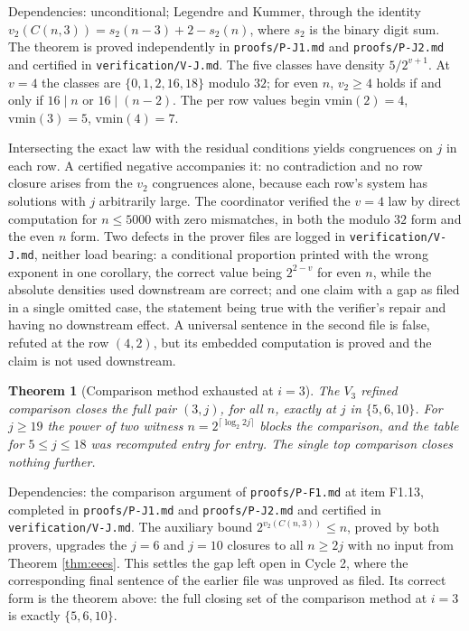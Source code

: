 \documentclass[11pt]{article}
\newtheorem{theorem}{Theorem}[section]
\theoremstyle{remark}
\begin{document}
Dependencies: unconditional; Legendre and Kummer, through the identity $v_2(C(n,3))=s_2(n-3)+2-s_2(n)$, where $s_2$ is the binary digit sum. The theorem is proved independently in \texttt{proofs/P-J1.md} and \texttt{proofs/P-J2.md} and certified in \texttt{verification/V-J.md}. The five classes have density $5/2^{v+1}$. At $v=4$ the classes are $\{0,1,2,16,18\}$ modulo $32$; for even $n$, $v_2\ge 4$ holds if and only if $16\mid n$ or $16\mid (n-2)$. The per row values begin $\mathrm{vmin}(2)=4$, $\mathrm{vmin}(3)=5$, $\mathrm{vmin}(4)=7$.

Intersecting the exact law with the residual conditions yields congruences on $j$ in each row. A certified negative accompanies it: no contradiction and no row closure arises from the $v_2$ congruences alone, because each row's system has solutions with $j$ arbitrarily large. The coordinator verified the $v=4$ law by direct computation for $n\le 5000$ with zero mismatches, in both the modulo $32$ form and the even $n$ form. Two defects in the prover files are logged in \texttt{verification/V-J.md}, neither load bearing: a conditional proportion printed with the wrong exponent in one corollary, the correct value being $2^{2-v}$ for even $n$, while the absolute densities used downstream are correct; and one claim with a gap as filed in a single omitted case, the statement being true with the verifier's repair and having no downstream effect. A universal sentence in the second file is false, refuted at the row $(4,2)$, but its embedded computation is proved and the claim is not used downstream.

\begin{theorem}[Comparison method exhausted at $i=3$]
\label{thm:comparison}
The $V_3$ refined comparison closes the full pair $(3,j)$, for all $n$, exactly at $j$ in $\{5,6,10\}$. For $j\ge 19$ the power of two witness $n=2^{\lceil\log_2 2j\rceil}$ blocks the comparison, and the table for $5\le j\le 18$ was recomputed entry for entry. The single top comparison closes nothing further.
\end{theorem}

Dependencies: the comparison argument of \texttt{proofs/P-F1.md} at item F1.13, completed in \texttt{proofs/P-J1.md} and \texttt{proofs/P-J2.md} and certified in \texttt{verification/V-J.md}. The auxiliary bound $2^{v_2(C(n,3))}\le n$, proved by both provers, upgrades the $j=6$ and $j=10$ closures to all $n\ge 2j$ with no input from Theorem \ref{thm:eees}. This settles the gap left open in Cycle 2, where the corresponding final sentence of the earlier file was unproved as filed. Its correct form is the theorem above: the full closing set of the comparison method at $i=3$ is exactly $\{5,6,10\}$.
\end{document}
